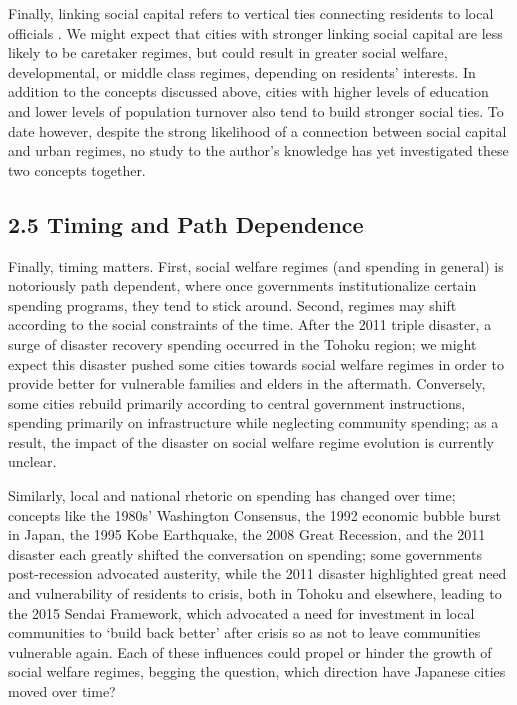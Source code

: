 \documentclass[preprint, 3p,
authoryear]{elsarticle} %
\begin{document}
Finally, linking social capital refers to vertical ties connecting
residents to local officials \citep{woolcock_2010, aldrich_2019}. We
might expect that cities with stronger linking social capital are less
likely to be caretaker regimes, but could result in greater social
welfare, developmental, or middle class regimes, depending on residents'
interests. In addition to the concepts discussed above, cities with
higher levels of education and lower levels of population turnover also
tend to build stronger social ties. To date however, despite the strong
likelihood of a connection between social capital and urban regimes, no
study to the author's knowledge has yet investigated these two concepts
together.

\hypertarget{timing-and-path-dependence}{%
\subsection{2.5 Timing and Path
Dependence}\label{timing-and-path-dependence}}

Finally, timing matters. First, social welfare regimes (and spending in
general) is notoriously path dependent, where once governments
institutionalize certain spending programs, they tend to stick around.
Second, regimes may shift according to the social constraints of the
time. After the 2011 triple disaster, a surge of disaster recovery
spending occurred in the Tohoku region; we might expect this disaster
pushed some cities towards social welfare regimes in order to provide
better for vulnerable families and elders in the aftermath. Conversely,
some cities rebuild primarily according to central government
instructions, spending primarily on infrastructure while neglecting
community spending; as a result, the impact of the disaster on social
welfare regime evolution is currently unclear.

Similarly, local and national rhetoric on spending has changed over
time; concepts like the 1980s' Washington Consensus, the 1992 economic
bubble burst in Japan, the 1995 Kobe Earthquake, the 2008 Great
Recession, and the 2011 disaster each greatly shifted the conversation
on spending; some governments post-recession advocated austerity, while
the 2011 disaster highlighted great need and vulnerability of residents
to crisis, both in Tohoku and elsewhere, leading to the 2015 Sendai
Framework, which advocated a need for investment in local communities to
`build back better' after crisis so as not to leave communities
vulnerable again. Each of these influences could propel or hinder the
growth of social welfare regimes, begging the question, which direction
have Japanese cities moved over time?
\end{document}
